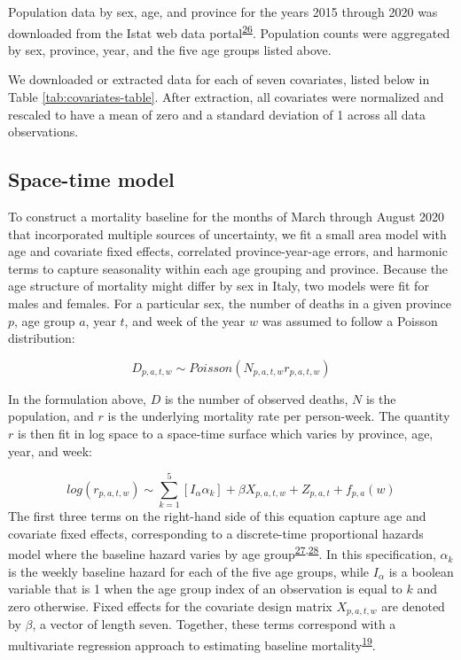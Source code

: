 \documentclass[
]{article}
\begin{document}
Population data by sex, age, and province for the years 2015 through 2020 was downloaded from the Istat web data portal\textsuperscript{\protect\hyperlink{ref-ItalianNationalInstituteofStatisticsIstat2020}{26}}⁠. Population counts were aggregated by sex, province, year, and the five age groups listed above.

We downloaded or extracted data for each of seven covariates, listed below in Table \ref{tab:covariates-table}. After extraction, all covariates were normalized and rescaled to have a mean of zero and a standard deviation of 1 across all data observations.

\hypertarget{space-time-model}{%
\subsection{Space-time model}\label{space-time-model}}

To construct a mortality baseline for the months of March through August 2020 that incorporated multiple sources of uncertainty, we fit a small area model with age and covariate fixed effects, correlated province-year-age errors, and harmonic terms to capture seasonality within each age grouping and province. Because the age structure of mortality might differ by sex in Italy, two models were fit for males and females. For a particular sex, the number of deaths in a given province \(p\), age group \(a\), year \(t\), and week of the year \(w\) was assumed to follow a Poisson distribution:

\[D_{p,a,t,w} \sim Poisson(N_{p,a,t,w}r_{p,a,t,w})\]

In the formulation above, \(D\) is the number of observed deaths, \(N\) is the population, and \(r\) is the underlying mortality rate per person-week. The quantity \(r\) is then fit in log space to a space-time surface which varies by province, age, year, and week:

\[log(r_{p,a,t,w}) \sim \sum_{k=1}^{5}[I_{\alpha}\alpha_{k}] + \beta X_{p,a,t,w} + Z_{p,a,t} + f_{p,a}(w)\]
The first three terms on the right-hand side of this equation capture age and covariate fixed effects, corresponding to a discrete-time proportional hazards model where the baseline hazard varies by age group\textsuperscript{\protect\hyperlink{ref-Cox1972}{27},\protect\hyperlink{ref-Burstein2019}{28}}⁠. In this specification, \(\alpha_k\) is the weekly baseline hazard for each of the five age groups, while \(I_\alpha\) is a boolean variable that is 1 when the age group index of an observation is equal to \(k\) and zero otherwise. Fixed effects for the covariate design matrix \(X_{p,a,t,w}\) are denoted by \(\beta\), a vector of length seven. Together, these terms correspond with a multivariate regression approach to estimating baseline mortality\textsuperscript{\protect\hyperlink{ref-Ederer1961}{19}}⁠.
\end{document}
